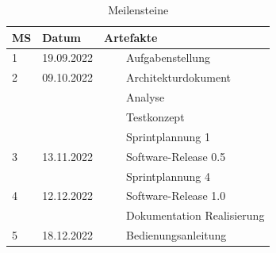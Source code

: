\documentclass[a4paper, table]{article}
\newcommand{\tabitem}{~~\llap{\textbullet}~~}
\begin{document}
\begin{table}[h]
    \centering
    \begin{tabular}{|l|l|l|}
        \hline
        \rowcolor[gray]{.9} MS & Datum & Artefakte \\
        \hline
        1 & 19.09.2022 & \tabitem Aufgabenstellung \\
        \hline
        2 & 09.10.2022 & \tabitem Architekturdokument \\
         & & \tabitem Analyse \\
         & & \tabitem Testkonzept \\
         & & \tabitem Sprintplannung 1 \\
        \hline
        3 & 13.11.2022 & \tabitem Software-Release 0.5 \\
         & & \tabitem Sprintplannung 4 \\
        \hline
        4 & 12.12.2022 & \tabitem Software-Release 1.0 \\
         & & \tabitem Dokumentation Realisierung \\
        \hline
        5 & 18.12.2022 & \tabitem Bedienungsanleitung \\
        \hline
    \end{tabular}
    \caption{Meilensteine}
    \label{tab: Meilensteine}
\end{table}
\clearpage
\end{document}
